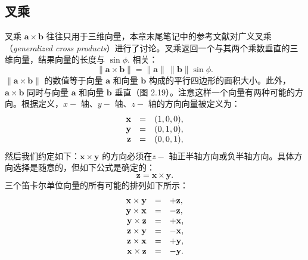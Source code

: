 \documentclass[lang=cn,12pt,marginpar=margintrue]{elegantbook}
\begin{document}
\subsection{叉乘}


叉乘 $\mathbf{a}\times\mathbf{b}$ 往往只用于三维向量，本章末尾笔记中的参考文献对广义叉乘（\textit{generalized cross products}）进行了讨论。叉乘返回一个与其两个乘数垂直的三维向量，结果向量的长度与 $\sin\phi.$ 相关：
\[
  \|\mathbf{a}\times\mathbf{b}\|=\|\mathbf{a}\|\,\|\mathbf{b}\|\sin\phi.
\]
$\|\mathbf{a}\times\mathbf{b}\|$ 的数值等于向量 $\mathbf{a}$ 和向量 $\mathbf{b}$ 构成的平行四边形的面积大小。此外，$\mathbf{a}\times\mathbf{b}$ 同时与向量 $\mathbf{a}$ 和向量 $\mathbf{b}$ 垂直（图 2.19）。注意这样一个向量有两种可能的方向。根据定义，$x-$ 轴、$y-$ 轴、$z-$ 轴的方向向量被定义为：
\[
  \begin{array}{r c l}{\mathbf{x}}&{=}&{(1,0,0),}\\ {\mathbf{y}}&{=}&{(0,1,0),}\\ {\mathbf{z}}&{=}&{(0,0,1),}\end{array}
\]
然后我们约定如下：$\mathbf{x}\times\mathbf{y}$ 的方向必须在$z-$ 轴正半轴方向或负半轴方向。具体方向选择是随意的，但如下公式是确定的：
\[
  \mathbf{z}=\mathbf{x}\times\mathbf{y}.
\]
三个笛卡尔单位向量的所有可能的排列如下所示：
\[
  \begin{array}{r c l}{{\mathbf{x}\times\mathbf{y}}}&{{=}}&{{+\mathbf{z},}}\\ {{\mathbf{y}\times\mathbf{x}}}&{{=}}&{{-\mathbf{z},}}\\ {{\mathbf{y}\times\mathbf{z}}}&{{=}}&{{+\mathbf{x},}}\\ {{\mathbf{z}\times\mathbf{y}}}&{{=}}&{{-\mathbf{x},}}\\ {{\mathbf{z}\times\mathbf{x}}}&{{=}}&{{+\mathbf{y},}}\\ {{\mathbf{x}\times\mathbf{z}}}&{{=}}&{{-\mathbf{y}.}}\end{array}
\]
\end{document}
